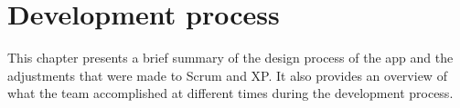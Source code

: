 \chapter{Development process}
\label{sec:devProcess}
This chapter presents a brief summary of the design process of the app and the adjustments that  were made to Scrum and XP. It also provides an overview of what the team accomplished at different times during the development process. 





